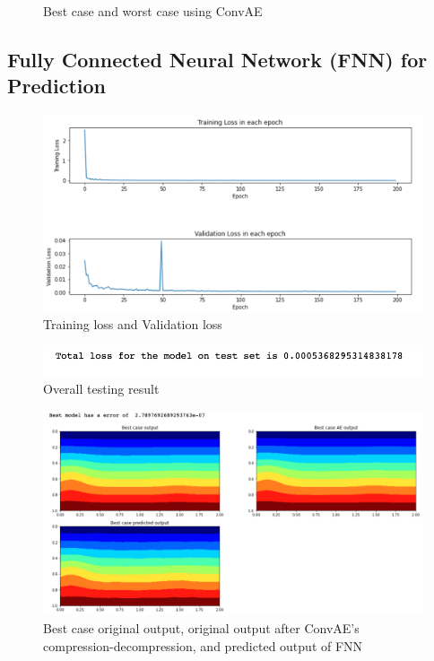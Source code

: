 \begin{figure}[H]
\caption{Best case and worst case using ConvAE}
\label{fig:figures}
\end{figure}



\subsection{Fully Connected Neural Network (FNN) for Prediction}

\begin{figure}[H]
    \caption{Training loss and Validation loss}
    \includegraphics[scale=0.6]{Report LaTeX/figures/mantle_convection_images/larger_dataset_interpolated/FNN_trainingData.png}
\end{figure}

\begin{figure}[H]
    \caption{Overall testing result}
    \includegraphics[scale=0.8]{Report LaTeX/figures/mantle_convection_images/larger_dataset_interpolated/FNN_OverallTesting.png}
\end{figure}

\begin{figure}[H]
    \caption{Best case original output, original output after ConvAE's compression-decompression, and predicted output of FNN}
    \includegraphics[scale=0.5]{Report LaTeX/figures/mantle_convection_images/larger_dataset_interpolated/FNN_Best.png}
\end{figure}

